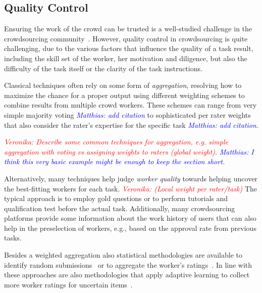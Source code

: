 \documentclass[10pt,twocolumn,letterpaper]{article}
\newcommand{\matthias}[1]{\emph{\textcolor{blue}{Matthias: #1}}}
\newcommand{\veronika}[1]{\emph{\textcolor{red}{Veronika: #1}}}
\begin{document}

\subsection{Quality Control}

Ensuring the work of the crowd can be trusted is a well-studied challenge in the crowdsourcing community~\cite{daniel2018quality}.
However, quality control in crowdsourcing is quite challenging, due to the various factors that influence the quality of a task result, including the skill set of the worker, her motivation and diligence, but also the difficulty of the task itself or the clarity of the task instructions. 


Classical techniques often rely on some form of \emph{aggregation}, resolving how to maximize the chance for a proper output using different weighting schemes to combine results from multiple crowd workers.
These schemes can range from very simple majority voting \matthias{add citation} to sophisticated per rater weights that also consider the rater's expertise for the specific task \matthias{add citation}. 

\veronika{Describe some common techniques for aggregation, e.g. simple aggregation with voting vs assigning weights to raters (global weight)}. 
\matthias{I think this very basic example might be enough to keep the section short.}

Alternatively, many techniques help judge \emph{worker quality} towards helping uncover the best-fitting workers for each task. \veronika{(Local weight per rater/task)}
The typical approach is to employ gold questions or to perform tutorials and qualification test before the actual task.
Additionally, many crowdsourcing platforms provide some information about the work history of users that can also help in the preselection of workers, e.g., based on the approval rate from previous tasks.

Besides a weighted aggregation also statistical methodologies are available to identify random submissions~\cite{kim2012filter} or to aggregate the worker's ratings~\cite{ribeiro2011crowdmos}.
In line with these approaches are also methodologies that apply adaptive learning to collect more worker ratings for uncertain items~\cite{yang2018leveraging}.
\end{document}
